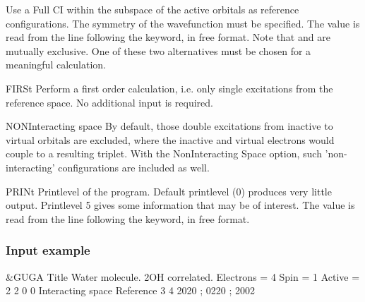 \begin{keywordlist}
Use a Full CI within the subspace of the active orbitals as
reference configurations. The symmetry of the wavefunction must be
specified. The value is read from the line following the keyword, in
free format. Note that
 and  are mutually exclusive.
One of these two alternatives must be chosen for a meaningful calculation.
\item[FIRSt]
Perform a first order calculation, i.e. only single excitations
from the reference space. No additional input is required.
\item[NONInteracting space]
By default, those double excitations from inactive
to virtual orbitals are excluded, where the inactive and virtual electrons
would couple to a resulting triplet.
With the NonInteracting Space option, such 'non-interacting' configurations
are included as well.
\item[PRINt]
Printlevel of the program. Default printlevel (0) produces very
little output. Printlevel 5 gives some information that may be of
interest. The value is read from the line following the keyword, in free
format.
\end{keywordlist}

\subsubsection{Input example}
\begin{inputlisting}
 &GUGA
Title
 Water molecule. 2OH correlated.
Electrons =     4
Spin      =     1
Active    =     2    2    0    0
Interacting space
Reference
    3    4
  2020 ; 0220 ; 2002
\end{inputlisting}
